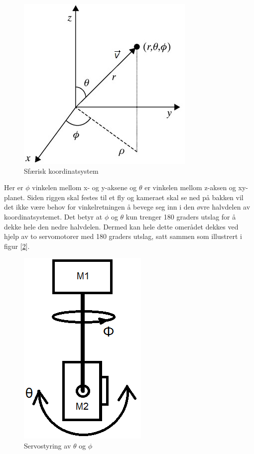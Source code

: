 \begin{figure}[h!]
	\centering
	\includegraphics[scale=0.5]{img/RettVek.jpg}
	\caption{Sfærisk koordinatsystem}
	\label{fig:spher}
\end{figure}

Her er $\phi$ vinkelen mellom x- og y-aksene og $\theta$ er vinkelen mellom z-aksen og xy-planet. Siden riggen skal festes til et fly og kameraet skal se ned på bakken vil det ikke være behov for vinkelretningen å bevege seg inn i den øvre halvdelen av koordinatsystemet. Det betyr at $\phi$ og $\theta$ kun trenger 180 graders utslag for å dekke hele den nedre halvdelen. Dermed kan hele dette omerådet dekkes ved hjelp av to servomotorer med 180 graders utslag, satt sammen som illustrert i figur [\ref{fig:IdeRigg}].

\begin{figure}[h!]
	\centering
	\includegraphics[scale=0.5]{img/BasicRiggIde.png}
	\caption{Servostyring av $\theta$ og $\phi$}
	\label{fig:IdeRigg}
\end{figure}

